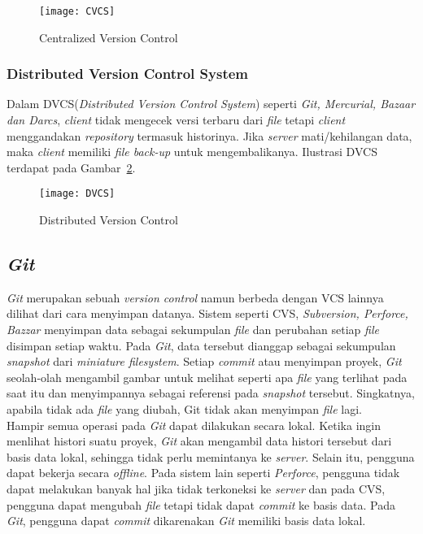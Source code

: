 \begin{figure}[H]
	\centering  
	\texttt{[image: CVCS]}  
	\caption[Centralized Version Control]{Centralized Version Control}
	\label{fig:CVCS} 
\end{figure}

\subsubsection{Distributed Version Control System}
Dalam DVCS(\textit{Distributed Version Control System}) seperti \textit{Git, Mercurial, Bazaar dan Darcs}, \textit{client} tidak mengecek versi terbaru dari \textit{file} tetapi \textit{client} menggandakan \textit{repository} termasuk historinya. Jika \textit{server} mati/kehilangan data, maka \textit{client} memiliki \textit{file back-up} untuk mengembalikanya.  Ilustrasi DVCS terdapat pada Gambar~\ref{fig:DVCS}.

\begin{figure}[H]
	\centering  
	\texttt{[image: DVCS]}  
	\caption[Distributed Version Control]{Distributed Version Control}
	\label{fig:DVCS} 
\end{figure}

\subsection{\textit{Git}}
\textit{Git} merupakan sebuah \textit{version control} namun berbeda dengan VCS lainnya dilihat dari cara menyimpan datanya. Sistem seperti CVS, \textit{Subversion, Perforce, Bazzar} menyimpan data sebagai sekumpulan \textit{file} dan perubahan setiap \textit{file} disimpan setiap waktu. Pada \textit{Git}, data tersebut dianggap sebagai sekumpulan \textit{snapshot} dari \textit{miniature filesystem}. Setiap \textit{commit} atau menyimpan proyek, \textit{Git} seolah-olah mengambil gambar untuk melihat seperti apa \textit{file} yang terlihat pada saat itu dan menyimpannya sebagai referensi pada \textit{snapshot} tersebut. Singkatnya, apabila tidak ada \textit{file} yang diubah, Git tidak akan menyimpan \textit{file} lagi.\\

Hampir semua operasi pada \textit{Git} dapat dilakukan secara lokal. Ketika ingin menlihat histori suatu proyek, \textit{Git} akan mengambil data histori tersebut dari basis data lokal, sehingga tidak perlu memintanya ke \textit{server}. Selain itu, pengguna dapat bekerja secara \textit{offline}. Pada sistem lain seperti \textit{Perforce}, pengguna tidak dapat melakukan banyak hal jika tidak terkoneksi ke \textit{server} dan pada CVS, pengguna dapat mengubah \textit{file} tetapi tidak dapat \textit{commit} ke basis data. Pada \textit{Git}, pengguna dapat \textit{commit} dikarenakan \textit{Git} memiliki basis data lokal.\\

